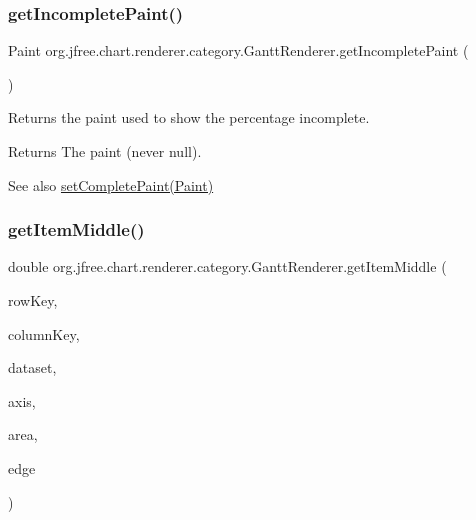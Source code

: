 \subsubsection{\texorpdfstring{get\+Incomplete\+Paint()}{getIncompletePaint()}}
{\footnotesize\ttfamily Paint org.\+jfree.\+chart.\+renderer.\+category.\+Gantt\+Renderer.\+get\+Incomplete\+Paint (\begin{DoxyParamCaption}{ }\end{DoxyParamCaption})}

Returns the paint used to show the percentage incomplete.

\begin{DoxyReturn}{Returns}
The paint (never {\ttfamily null}).
\end{DoxyReturn}
\begin{DoxySeeAlso}{See also}
\mbox{\hyperlink{classorg_1_1jfree_1_1chart_1_1renderer_1_1category_1_1_gantt_renderer_a1c8e067f9e946aae2f936646c0334bd7}{set\+Complete\+Paint(\+Paint)}} 
\end{DoxySeeAlso}
\mbox{\label{classorg_1_1jfree_1_1chart_1_1renderer_1_1category_1_1_gantt_renderer_a0f2caf6d4545eb08a9c3ca1df44d02c4}} 
\subsubsection{\texorpdfstring{get\+Item\+Middle()}{getItemMiddle()}}
{\footnotesize\ttfamily double org.\+jfree.\+chart.\+renderer.\+category.\+Gantt\+Renderer.\+get\+Item\+Middle (\begin{DoxyParamCaption}\item[{Comparable}]{row\+Key,  }\item[{Comparable}]{column\+Key,  }\item[{\mbox{\hyperlink{interfaceorg_1_1jfree_1_1data_1_1category_1_1_category_dataset}{Category\+Dataset}}}]{dataset,  }\item[{\mbox{\hyperlink{classorg_1_1jfree_1_1chart_1_1axis_1_1_category_axis}{Category\+Axis}}}]{axis,  }\item[{Rectangle2D}]{area,  }\item[{Rectangle\+Edge}]{edge }\end{DoxyParamCaption})}

